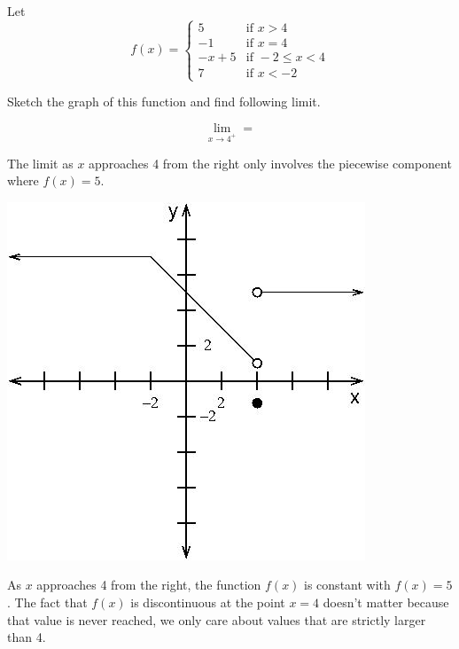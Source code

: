 \documentclass{ximera}
\author{Emma Smith Zbarsky}
\begin{document}
\begin{exercise}

Let
\[f(x) = \begin{cases} 5 & \mbox{if } x>4 \\ -1 & \mbox{if } x=4 \\ -x+5 & \mbox{if } -2\leq x < 4 \\ 7 & \mbox{if } x<-2 \end{cases}\]

Sketch the graph of this function and find following limit.

\[\lim_{x \to 4^+} = \]


\begin{hint}
The limit as $x$ approaches 4 from the right only involves the piecewise
component where $f(x) = 5$.
\end{hint}


\begin{hint}
\begin{image}\includegraphics{piecewise.jpg}\end{image}



As $x$ approaches 4 from the right, the function $f(x)$ is constant with
$f(x)=5$. The fact that $f(x)$ is discontinuous at the point $x=4$
doesn't matter because that value is never reached, we only care about
values that are strictly larger than 4.
\end{hint}


\begin{multipleChoice}
\end{multipleChoice}

\end{exercise}
\end{document}
